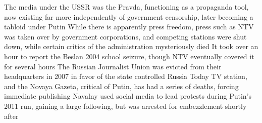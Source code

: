 \documentclass[11 pt, twoside]{article}
\newenvironment{outline*}
{
	\begin{outline}[enumerate]
	}
	{\end{outline}
}
\begin{document}
\begin{outline*}
\2 The media under the USSR was the Pravda, functioning as a propaganda tool, now existing far more independently of government censorship, later becoming a tabloid under Putin
\3 While there is apparently press freedom, press such as NTV was taken over by government corporations, and competing stations were shut down, while certain critics of the administration mysteriously died
\3 It took over an hour to report the Beslan 2004 school seizure, though NTV eventually covered it for several hours
\3 The Russian Journalist Union was evicted from their headquarters in 2007 in favor of the state controlled Russia Today TV station, and the Novaya Gazeta, critical of Putin, has had a series of deaths, forcing immediate publishing
\3 Navalny used social media to lead protests during Putin's 2011 run, gaining a large following, but was arrested for embezzlement shortly after
\end{outline*}
\end{document}
